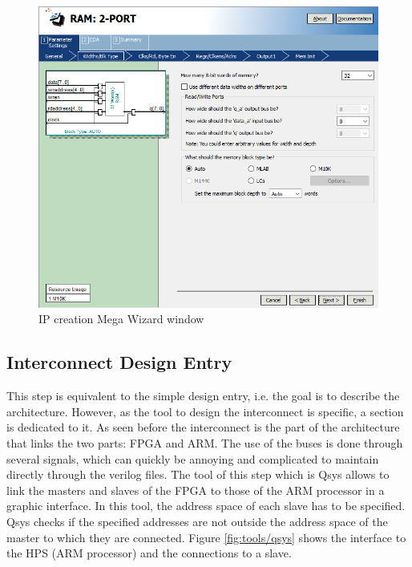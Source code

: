 \begin{figure}[H]
    \centering
    \includegraphics[scale=0.6]{Chapter2-FPGA_Flow/res/megawizard.PNG}
    \caption{IP creation Mega Wizard window}
    \label{fig:tools/megawizard}
\end{figure}

\subsection{Interconnect Design Entry}

This step is equivalent to the simple design entry, i.e. the goal is to describe the architecture. 
However, as the tool to design the interconnect is specific, a section is dedicated to it. As seen 
before the interconnect is the part of the architecture that links the two parts: FPGA and ARM. The 
use of the buses is done through several signals, which can quickly be annoying and complicated to 
maintain directly through the verilog files. The tool of this step which is Qsys allows to link 
the masters and slaves of the FPGA to those of the ARM processor in a graphic interface. In this 
tool, the address space of each slave has to be specified. Qsys checks if the specified 
addresses are not outside the address space of the master to which they are connected. Figure \ref{fig:tools/qsys} 
shows the interface to the HPS (ARM processor) and the connections to a slave.

